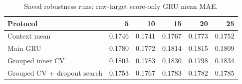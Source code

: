 \begin{table}[!ht]
\centering
\small
\setlength{\tabcolsep}{5pt}
\renewcommand{\arraystretch}{1.1}
\caption{Saved robustness runs: raw-target score-only GRU mean MAE.}
\label{tab:supp_robustness}
\begin{tabular}{lrrrrr}
\toprule
Protocol & 5 & 10 & 15 & 20 & 25 \\
\midrule
Context mean & 0.1746 & 0.1741 & 0.1767 & 0.1773 & 0.1752 \\
Main GRU & 0.1780 & 0.1772 & 0.1814 & 0.1815 & 0.1809 \\
Grouped inner CV & 0.1803 & 0.1783 & 0.1830 & 0.1798 & 0.1834 \\
Grouped CV + dropout search & 0.1753 & 0.1767 & 0.1783 & 0.1782 & 0.1785 \\
\bottomrule
\end{tabular}
\end{table}
